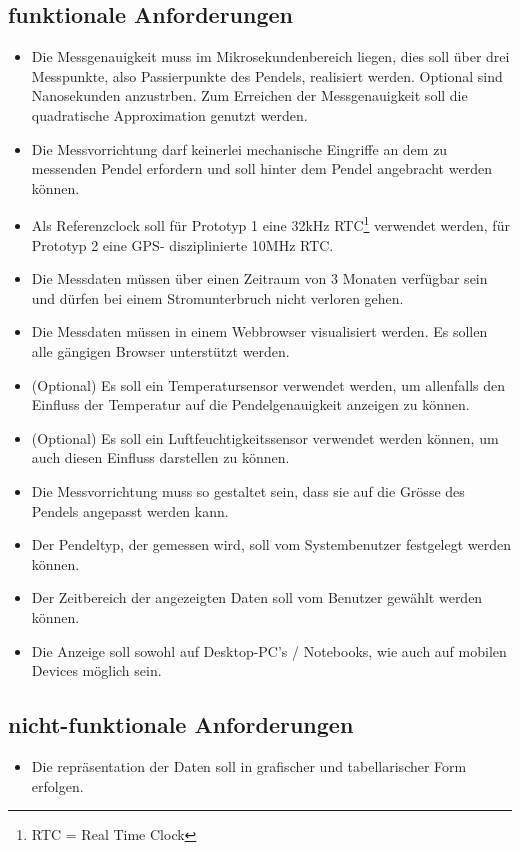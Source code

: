 \subsection{funktionale Anforderungen}
	\begin{itemize}
		\item Die Messgenauigkeit muss im Mikrosekundenbereich liegen, dies soll über drei 	Messpunkte, also Passierpunkte des Pendels, realisiert werden. Optional sind Nanosekunden anzustrben. Zum Erreichen der Messgenauigkeit soll die quadratische Approximation genutzt werden.
		\item Die Messvorrichtung darf keinerlei mechanische Eingriffe an dem zu messenden Pendel erfordern und soll hinter dem Pendel angebracht werden können.
		\item Als Referenzclock soll für Prototyp 1 eine 32kHz RTC\footnote{RTC = Real Time Clock} verwendet werden, für Prototyp 2 eine GPS- disziplinierte 10MHz RTC.
		\item Die Messdaten müssen über einen Zeitraum von 3 Monaten verfügbar sein und dürfen bei einem Stromunterbruch nicht verloren gehen.
		\item Die Messdaten müssen in einem Webbrowser visualisiert werden. Es sollen alle gängigen Browser unterstützt werden.
		\item (Optional) Es soll ein Temperatursensor verwendet werden, um allenfalls den Einfluss der Temperatur auf die Pendelgenauigkeit anzeigen zu können.
		\item (Optional) Es soll ein Luftfeuchtigkeitssensor verwendet werden können, um auch diesen Einfluss darstellen zu können.
		\item Die Messvorrichtung muss so gestaltet sein, dass sie auf die Grösse des Pendels angepasst werden kann.
		\item Der Pendeltyp, der gemessen wird, soll vom Systembenutzer festgelegt werden können.
		\item Der Zeitbereich der angezeigten Daten soll vom Benutzer gewählt werden können.
		\item Die Anzeige soll sowohl auf Desktop-PC's / Notebooks, wie auch auf mobilen Devices möglich sein.
	\end{itemize}
\subsection{nicht-funktionale Anforderungen}
	\begin{itemize}
		\item Die repräsentation der Daten soll in grafischer und tabellarischer Form erfolgen.
	\end{itemize}


